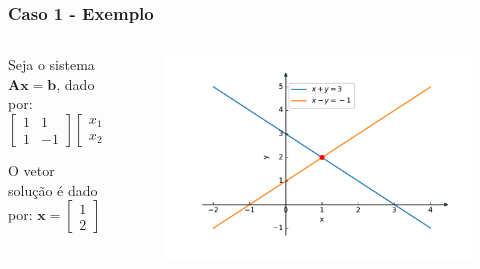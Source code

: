 \documentclass{beamer}
\theoremstyle{mystyle}
\begin{document}
\begin{frame}
	\frametitle{Caso 1 - Exemplo}
	\begin{columns}
		\begin{column}{0.4\textwidth} 
			Seja o sistema $ \mathbf{Ax} = \mathbf{b}$, dado por:
			\begin{equation*}
				\left[
				\begin{array}{cc}
					1 & 1 \\
					1 & -1 
				\end{array}
				\right] 
				\begin{bmatrix} x_{1} \\ x_{2} \end{bmatrix}
				=
				\begin{bmatrix} 3 \\ -1 \end{bmatrix}
			\end{equation*}
			
			O vetor solução é dado por: $ \mathbf{x} = \begin{bmatrix} 1 \\ 2 \end{bmatrix} $
		\end{column}
		\begin{column}{0.6\textwidth}	
			\begin{figure}
				\centering
				\includegraphics[width=\linewidth]{Figuras/grafico_01}
				\label{fig:grafico_01}
			\end{figure}
		\end{column}
	\end{columns}
\end{frame}
\end{document}
